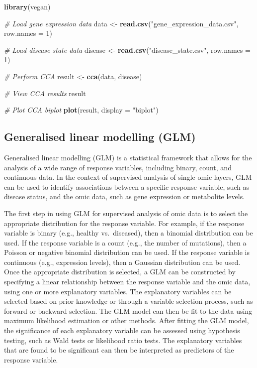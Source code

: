 \documentclass[
]{book}
\newenvironment{Shaded}{\begin{snugshade}}{\end{snugshade}}
\newcommand{\AttributeTok}[1]{\textcolor[rgb]{0.13,0.29,0.53}{#1}}
\newcommand{\CommentTok}[1]{\textcolor[rgb]{0.56,0.35,0.01}{\textit{#1}}}
\newcommand{\DecValTok}[1]{\textcolor[rgb]{0.00,0.00,0.81}{#1}}
\newcommand{\FunctionTok}[1]{\textcolor[rgb]{0.13,0.29,0.53}{\textbf{#1}}}
\newcommand{\NormalTok}[1]{#1}
\newcommand{\OtherTok}[1]{\textcolor[rgb]{0.56,0.35,0.01}{#1}}
\newcommand{\StringTok}[1]{\textcolor[rgb]{0.31,0.60,0.02}{#1}}
\begin{document}
\begin{Shaded}
\begin{Highlighting}[]
\FunctionTok{library}\NormalTok{(vegan)}

\CommentTok{\# Load gene expression data}
\NormalTok{data }\OtherTok{\textless{}{-}} \FunctionTok{read.csv}\NormalTok{(}\StringTok{"gene\_expression\_data.csv"}\NormalTok{, }\AttributeTok{row.names =} \DecValTok{1}\NormalTok{)}

\CommentTok{\# Load disease state data}
\NormalTok{disease }\OtherTok{\textless{}{-}} \FunctionTok{read.csv}\NormalTok{(}\StringTok{"disease\_state.csv"}\NormalTok{, }\AttributeTok{row.names =} \DecValTok{1}\NormalTok{)}

\CommentTok{\# Perform CCA}
\NormalTok{result }\OtherTok{\textless{}{-}} \FunctionTok{cca}\NormalTok{(data, disease)}

\CommentTok{\# View CCA results}
\NormalTok{result}

\CommentTok{\# Plot CCA biplot}
\FunctionTok{plot}\NormalTok{(result, }\AttributeTok{display =} \StringTok{"biplot"}\NormalTok{)}
\end{Highlighting}
\end{Shaded}

\normalsize

\hypertarget{generalised-linear-modelling}{%
\subsection{Generalised linear modelling (GLM)}\label{generalised-linear-modelling}}

Generalised linear modelling (GLM) is a statistical framework that allows for the analysis of a wide range of response variables, including binary, count, and continuous data. In the context of supervised analysis of single omic layers, GLM can be used to identify associations between a specific response variable, such as disease status, and the omic data, such as gene expression or metabolite levels.

The first step in using GLM for supervised analysis of omic data is to select the appropriate distribution for the response variable. For example, if the response variable is binary (e.g., healthy vs.~diseased), then a binomial distribution can be used. If the response variable is a count (e.g., the number of mutations), then a Poisson or negative binomial distribution can be used. If the response variable is continuous (e.g., expression levels), then a Gaussian distribution can be used. Once the appropriate distribution is selected, a GLM can be constructed by specifying a linear relationship between the response variable and the omic data, using one or more explanatory variables. The explanatory variables can be selected based on prior knowledge or through a variable selection process, such as forward or backward selection. The GLM model can then be fit to the data using maximum likelihood estimation or other methods. After fitting the GLM model, the significance of each explanatory variable can be assessed using hypothesis testing, such as Wald tests or likelihood ratio tests. The explanatory variables that are found to be significant can then be interpreted as predictors of the response variable.
\end{document}

